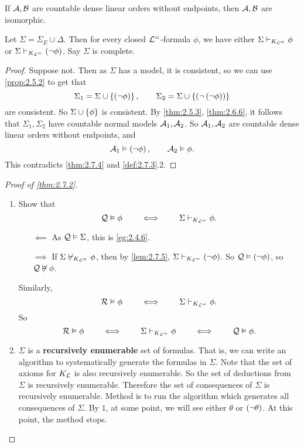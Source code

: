 \begin{theorem}[Cantor]
\label{thm:2.7.4}
If $ \AA, \BB $ are countable dense linear orders without endpoints, then $ \AA, \BB $ are isomorphic.
\end{theorem}

\begin{lemma}
\label{lem:2.7.5}
Let $ \Sigma = \Sigma_E \cup \Delta $. Then for every closed $ \LL^= $-formula $ \phi $, we have either $ \Sigma \vdash_{K_{\LL^=}} \phi $ or $ \Sigma \vdash_{K_{\LL^=}} \notb{\phi} $. Say $ \Sigma $ is complete.
\end{lemma}

\begin{proof}
Suppose not. Then as $ \Sigma $ has a model, it is consistent, so we can use \ref{prop:2.5.2} to get that
$$ \Sigma_1 = \Sigma \cup \cb{\notb{\phi}}, \qquad \Sigma_2 = \Sigma \cup \cb{\notb{\notb{\phi}}} $$
are consistent. So $ \Sigma \cup \cb{\phi} $ is consistent. By \ref{thm:2.5.3}, \ref{thm:2.6.6}, it follows that $ \Sigma_1, \Sigma_2 $ have countable normal models $ \AA_1, \AA_2 $. So $ \AA_1, \AA_2 $ are countable dense linear orders without endpoints, and
$$ \AA_1 \vDash \notb{\phi}, \qquad \AA_2 \vDash \phi. $$
This contradicts \ref{thm:2.7.4} and \ref{def:2.7.3}.$ 2 $.
\end{proof}

\begin{proof}[Proof of \ref{thm:2.7.2}]
\hfill
\begin{enumerate}
\item Show that
$$ \QQ \vDash \phi \qquad \iff \qquad \Sigma \vdash_{K_{\LL^=}} \phi. $$
\begin{itemize}
\item[$ \impliedby $] As $ \QQ \vDash \Sigma $, this is \ref{eg:2.4.6}.
\item[$ \implies $] If $ \Sigma \not\vdash_{K_{\LL^=}} \phi $, then by \ref{lem:2.7.5}, $ \Sigma \vdash_{K_{\LL^=}} \notb{\phi} $. So $ \QQ \vDash \notb{\phi} $, so $ \QQ \not\vDash \phi $.
\end{itemize}
Similarly,
$$ \RR \vDash \phi \qquad \iff \qquad \Sigma \vdash_{K_{\LL^=}} \phi. $$
So
$$ \RR \vDash \phi \qquad \iff \qquad \Sigma \vdash_{K_{\LL^=}} \phi \qquad \iff \qquad \QQ \vDash \phi. $$
\item $ \Sigma $ is a \textbf{recursively enumerable} set of formulas. That is, we can write an algorithm to systematically generate the formulas in $ \Sigma $. Note that the set of axioms for $ K_{\LL} $ is also recursively enumerable. So the set of deductions from $ \Sigma $ is recursively enumerable. Therefore the set of consequences of $ \Sigma $ is recursively enumerable. Method is to run the algorithm which generates all consequences of $ \Sigma $. By $ 1 $, at some point, we will see either $ \theta $ or $ \notb{\theta} $. At this point, the method stops.
\end{enumerate}
\end{proof}

